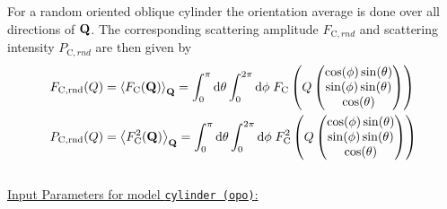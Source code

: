 For a random oriented oblique cylinder the orientation average is done over all directions of $\B{Q}$. The corresponding scattering amplitude $F_{\mathrm{C},rnd}$ and scattering intensity $P_{\mathrm{C},rnd}$ are then given by
\begin{align}
F_{\mathrm{C,rnd}}(Q) &= \left\langle F_\mathrm{C}(\B{Q})\right\rangle_\B{Q} = \int_0^\pi\mathrm{d}\theta \int_0^{2\pi}\mathrm{d}\phi \; F_\mathrm{C}\left(Q\begin{pmatrix}
                                       \cos(\phi)\sin(\theta) \\
                                       \sin(\phi)\sin(\theta) \\
                                       \cos(\theta)
                                     \end{pmatrix}\right) \\
P_{\mathrm{C,rnd}}(Q) &= \left\langle F_\mathrm{C}^2(\B{Q})\right\rangle_\B{Q} = \int_0^\pi\mathrm{d}\theta \int_0^{2\pi}\mathrm{d}\phi \; F_\mathrm{C}^2\left(Q\begin{pmatrix}
                                       \cos(\phi)\sin(\theta) \\
                                       \sin(\phi)\sin(\theta) \\
                                       \cos(\theta)
                                     \end{pmatrix}\right)
\end{align}
~\\
\uline{Input Parameters for model \texttt{cylinder (opo)}:}
